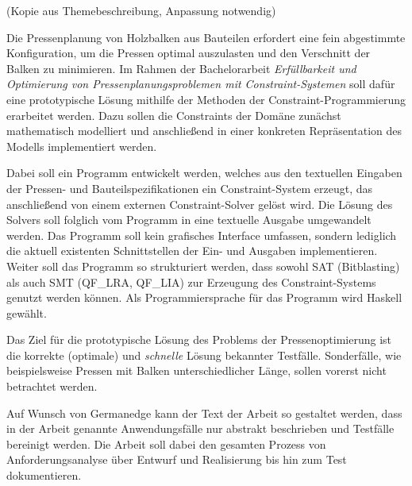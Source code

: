 \abstract
\label{sec:Abstrakt}

(Kopie aus Themebeschreibung, Anpassung notwendig)

Die Pressenplanung von Holzbalken aus Bauteilen erfordert eine fein abgestimmte Konfiguration, um die Pressen optimal auszulasten und den Verschnitt der Balken zu minimieren.
Im Rahmen der Bachelorarbeit \textit{Erfüllbarkeit und Optimierung von Pressenplanungsproblemen mit Constraint-Systemen} soll dafür eine prototypische Lösung mithilfe der Methoden der Constraint-Programmierung erarbeitet werden.
Dazu sollen die Constraints der Domäne zunächst mathematisch modelliert und anschließend in einer konkreten Repräsentation des Modells implementiert werden.

Dabei soll ein Programm entwickelt werden, welches aus den textuellen Eingaben der Pressen- und Bauteilspezifikationen ein Constraint-System erzeugt, das anschließend von einem externen Constraint-Solver gelöst wird.
Die Lösung des Solvers soll folglich vom Programm in eine textuelle Ausgabe umgewandelt werden.
Das Programm soll kein grafisches Interface umfassen, sondern lediglich die aktuell existenten Schnittstellen der Ein- und Ausgaben implementieren.
Weiter soll das Programm so strukturiert werden, dass sowohl SAT (Bitblasting) als auch SMT (QF\_LRA, QF\_LIA) zur Erzeugung des Constraint-Systems genutzt werden können.
Als Programmiersprache für das Programm wird Haskell gewählt.

Das Ziel für die prototypische Lösung des Problems der Pressenoptimierung ist die korrekte (optimale) und \textit{schnelle} Lösung bekannter Testfälle.
Sonderfälle, wie beispielsweise Pressen mit Balken unterschiedlicher Länge, sollen vorerst nicht betrachtet werden.

Auf Wunsch von Germanedge kann der Text der Arbeit so gestaltet werden, dass in der Arbeit genannte Anwendungsfälle nur abstrakt beschrieben und Testfälle bereinigt werden.
Die Arbeit soll dabei den gesamten Prozess von Anforderungsanalyse über Entwurf und Realisierung bis hin zum Test dokumentieren.